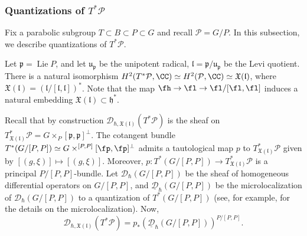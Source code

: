 \documentclass[12pt]{amsart}
\begin{document}




\subsubsection{Quantizations of $T^*\mathcal{P}$}\label{quant_G_mod_P}
Fix a parabolic subgroup $T \subset B \subset P \subset G$ and recall $\mathcal{P}=G/P$.
In this subsection, we describe quantizations of $T^*\mathcal{P}$. 

Let $\mathfrak{p}=\operatorname{Lie}P$, and let $\mathfrak{u}_{\mathfrak{p}}$ be the unipotent radical, $\mathfrak{l}=\mathfrak{p}/\mathfrak{u}_{\mathfrak{p}}$ be the Levi quotient. There is a natural isomorphism $H^2(T^*\mathcal{P},\CC) \simeq H^2(\mathcal{P},\CC) \simeq \mathfrak{X}(\mathfrak{l})$, where $\mathfrak{X}(\mathfrak{l})=(\mathfrak{l}/[\mathfrak{l},\mathfrak{l}])^*$. 
  Note that the map $\fh\to \fl\to \fl/[\fl,\fl]$ induces a natural embedding $\mathfrak{X}(\mathfrak{l}) \subset \mathfrak{h}^*$. 


Recall that by construction $\mathcal{D}_{\hbar,\mathfrak{X}(\mathfrak{l})}(T^*\mathcal{P})$ is the sheaf on $T^*_{\mathfrak{X}(\mathfrak{l})}\mathcal{P}= G \times_P [\mathfrak{p},\mathfrak{p}]^{\perp}$. The cotangent bundle $T^*(G/[P,P])\simeq G\times^{[P,P]} [\fp,\fp]^\perp$ admits a tautological map $p$ to $ T^*_{\mathfrak{X}(\mathfrak{l})}\mathcal{P}$ given by $[(g, \xi)] \mapsto [(g, \xi)]$. Moreover, $p\colon T^*(G/[P,P]) \rightarrow T^*_{\mathfrak{X}(\mathfrak{l})}\mathcal{P}$ is a principal $P/[P,P]$-bundle. Let $\mathcal{D}_{\hbar}(G/[P,P])$ be the sheaf of homogeneous differential operators on $G/[P,P]$, and $\underline{\mathcal{D}}_{\hbar}(G/[P,P])$ be the microlocalization of $\mathcal{D}_{\hbar}(G/[P,P])$ to a quantization of $T^*(G/[P,P])$ (see, for example, \cite{Ginzburg1986} for the details on the microlocalization). Now, 
\begin{equation*}
\mathcal{D}_{\hbar,\mathfrak{X}(\mathfrak{l})}(T^*\mathcal{P}) = p_*(\underline{\mathcal{D}}_{\hbar}(G/[P,P]))^{P/[P,P]}.
\end{equation*} 
\end{document}
